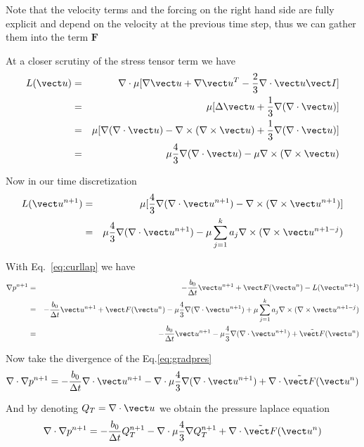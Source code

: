 Note that the velocity terms and the forcing on the right hand side are fully explicit and depend on the velocity at the previous time step, thus we can gather them into the term $\mathbf F$

At a closer scrutiny of the stress tensor term we have
\begin{eqnarray}
L(\vect u)&=&\nabla\cdot\mu[\nabla \vect u+\nabla \vect u^T-\frac{2}{3}\nabla \cdot \vect u \vect I] \\ \nonumber
&=& \mu[\Delta \vect u+\frac{1}{3}\nabla (\nabla\cdot \vect u)] \\ \nonumber
&=& \mu[\nabla (\nabla\cdot \vect u)-\nabla\times(\nabla\times \vect u)+\frac{1}{3}\nabla (\nabla\cdot \vect u)] \\ \nonumber
&=&\mu\frac{4}{3}\nabla (\nabla\cdot \vect u)-\mu\nabla\times(\nabla\times \vect u) \nonumber
\end{eqnarray}

Now in our time discretization
\begin{eqnarray}
L(\vect u^{n+1})&=& \mu[\frac{4}{3}\nabla (\nabla\cdot \vect u^{n+1})-\nabla\times(\nabla\times \vect u^{n+1})] \\ \nonumber
&=& \mu\frac{4}{3}\nabla (\nabla\cdot \vect u^{n+1})-\mu\sum\limits_{j=1}^k a_j\nabla\times(\nabla\times \vect u^{n+1-j}) 
\label{eq:curllap}
\end{eqnarray}

With Eq.~\ref{eq:curllap} we have
\begin{eqnarray}
\nabla p^{n+1}&=&-\frac{b_0}{\Delta t} \vect u^{n+1}  +\vect F(\vect u^n)-L(\vect u^{n+1})\\ \nonumber
&=&-\frac{b_0}{\Delta t} \vect u^{n+1}  +\vect F(\vect u^n)-\mu\frac{4}{3}\nabla (\nabla\cdot \vect u^{n+1})+\mu\sum\limits_{j=1}^k a_j\nabla\times(\nabla\times \vect u^{n+1-j})\\ \nonumber
&=&-\frac{b_0}{\Delta t} \vect u^{n+1} -\mu\frac{4}{3}\nabla (\nabla\cdot \vect u^{n+1}) +\tilde{\vect F}(\vect u^n)
\end{eqnarray}\label{eq:gradpres}




Now take the divergence of the Eq.\ref{eq:gradpres}
\begin{eqnarray}
\nabla\cdot \nabla p^{n+1}=-\frac{b_0}{\Delta t} \nabla\cdot \vect u^{n+1} -\nabla\cdot \mu\frac{4}{3}\nabla (\nabla\cdot \vect u^{n+1}) +\nabla\cdot \tilde{\vect F}(\vect u^n)
\end{eqnarray}

And by denoting $Q_T=\nabla\cdot \vect u$ we obtain the pressure laplace equation
\begin{eqnarray}
\nabla\cdot \nabla p^{n+1}=-\frac{b_0}{\Delta t} Q_T^{n+1} -\nabla\cdot \mu\frac{4}{3}\nabla Q_T^{n+1} +\nabla\cdot \tilde{\vect F}(\vect u^n)
\end{eqnarray}\label{eq:lappres}


